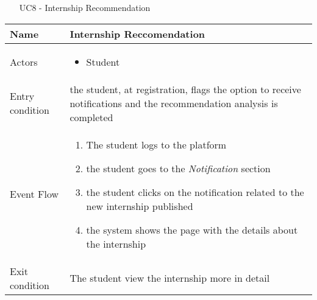 				
					
				
				\begin{table} [H]
					\centering
					\begin{itemize}
						\item [UC8] - Internship Recommendation
					\end{itemize}
					\begin{tabular}{|| P{7.5cm} | P{7.5cm} ||}
						\hline
						Name & Internship Reccomendation \\
						\hline
						Actors & \parbox{5cm}{\begin{itemize}
								\item Student
							\end{itemize}
						} \\
						\hline
						Entry condition & the student, at registration, flags the 
						option to receive notifications and the recommendation analysis is completed\\
						\hline
						Event Flow & \parbox{5cm}{\begin{enumerate}[label=\alpha]
								\item The student logs to the platform  
								\item the student goes to the \textit{Notification} 
								section
								\item  the student clicks on the notification 
								related to the new internship 
								published
								\item the system shows the page with the 
								details about the internship  
						\end{enumerate}} \\
						\hline 
						Exit condition & The student view the internship more in 
						detail \\
						\hline
					\end{tabular}
				\end{table}
				
